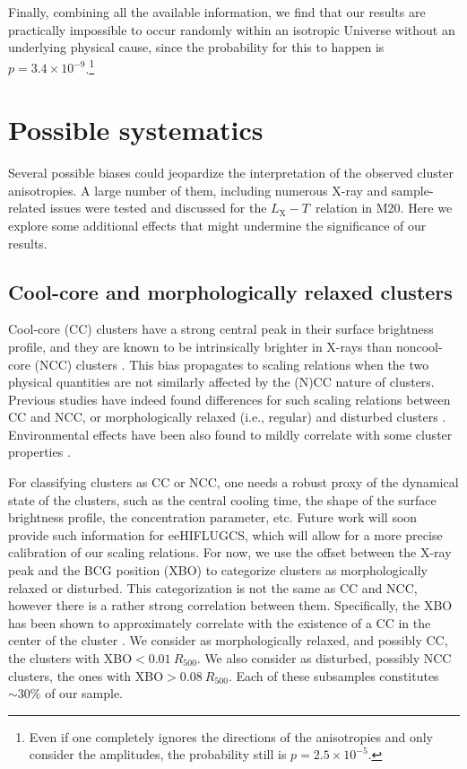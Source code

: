\documentclass{aa}   %
\newcommand{\LT}{$L_{\text{X}}-T$}
\begin{document}
Finally, combining all the available information, we find that our results are practically impossible to occur randomly within an isotropic Universe without an underlying physical cause, since the probability for this to happen is $p=3.4\times 10^{-9}$.\footnote{Even if one completely ignores the directions of the anisotropies and only consider the amplitudes, the probability still is $p=2.5\times 10^{-5}$.}



\section{Possible systematics}\label{systematics}

Several possible biases could jeopardize the interpretation of the observed cluster anisotropies. A large number of them, including numerous X-ray and sample-related issues were tested and discussed for the \LT\ relation in M20. Here we explore some additional effects that might undermine the significance of our results. 

\subsection{Cool-core and morphologically relaxed clusters}\label{cc-bias}

Cool-core (CC) clusters have a strong central peak in their surface brightness profile, and they are known to be intrinsically brighter in X-rays than noncool-core (NCC) clusters \citep[e.g.][]{mittal}. This bias propagates to scaling relations when the two physical quantities are not similarly affected by the (N)CC nature of clusters. Previous studies have indeed found differences for such scaling relations between CC and NCC, or morphologically relaxed (i.e., regular) and disturbed clusters \citep[e.g.,][]{Maughan07,pratt,zhang,maughan,bharad,lorenzo20}. Environmental effects have been also found to mildly correlate with some cluster properties \citep[M18,][]{maria}.

For classifying clusters as CC or NCC, one needs a robust proxy of the dynamical state of the clusters, such as the central cooling time, the shape of the surface brightness profile, the concentration parameter, etc. Future work will soon provide such information for eeHIFLUGCS, which will allow for a more precise calibration of our scaling relations. For now, we use the offset between the X-ray peak and the BCG position (XBO) to categorize clusters as morphologically relaxed or disturbed. This categorization is not the same as CC and NCC, however there is a rather strong correlation between them. Specifically, the XBO has been shown to approximately correlate with the existence of a CC in the center of the cluster \citep[e.g.,][]{hudson,zitrin,rossetti,Lopes}. We consider as morphologically relaxed, and possibly CC, the clusters with XBO$<0.01\ R_{500}$. We also consider as disturbed, possibly NCC clusters, the ones with XBO$>0.08\ R_{500}$. Each of these subsamples constitutes $\sim 30\%$ of our sample.
\end{document}
